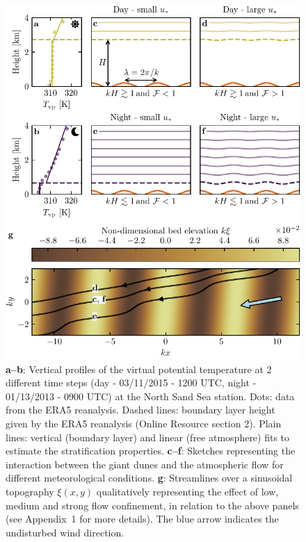 \begin{figure}
\centering
\includegraphics[scale=1]{Figures/Figure4.pdf}
\caption{\textbf{a--b}: Vertical profiles of the virtual potential temperature at 2 different time steps (day - 03/11/2015 - 1200 UTC, night - 01/13/2013 - 0900 UTC) at the North Sand Sea station. Dots: data from the ERA5 reanalysis. Dashed lines: boundary layer height given by the ERA5 reanalysis (Online Resource section 2). Plain lines: vertical (boundary layer) and linear (free atmosphere) fits to estimate the stratification properties. \textbf{c--f}: Sketches representing the interaction between the giant dunes and the atmospheric flow for different meteorological conditions. \textbf{g}: Streamlines over a sinusoidal topography $\xi(x,y)$ qualitatively representing the effect of low, medium and strong flow confinement, in relation to the above panels (see Appendix~1 for more details). The blue arrow indicates the undisturbed wind direction.}
\label{Fig4}
\end{figure}


